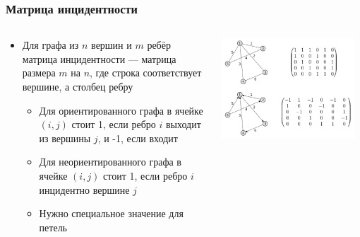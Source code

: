\documentclass{../../slides-style}
\begin{document}
    \begin{frame}
        \frametitle{Матрица инцидентности}
        \begin{columns}
            \begin{column}{0.5\textwidth}
                \begin{itemize}
                    \item Для графа из $n$ вершин и $m$ ребёр матрица инцидентности --- матрица размера $m$ на $n$, где строка соответствует вершине, а столбец ребру
                    \begin{itemize}
                        \item Для ориентированного графа в ячейке $(i, j)$ стоит 1, если ребро $i$ выходит из вершины $j$, и -1, если входит
                        \item Для неориентированного графа в ячейке $(i, j)$ стоит 1, если ребро $i$ инцидентно вершине $j$
                        \item Нужно специальное значение для петель
                    \end{itemize}
                \end{itemize}
            \end{column}
            \begin{column}{0.5\textwidth}
                \begin{center}
                    \includegraphics[width=0.95\textwidth]{incidence-matrix.png}
                \end{center}
            \end{column}
        \end{columns}
    \end{frame}
\end{document}
